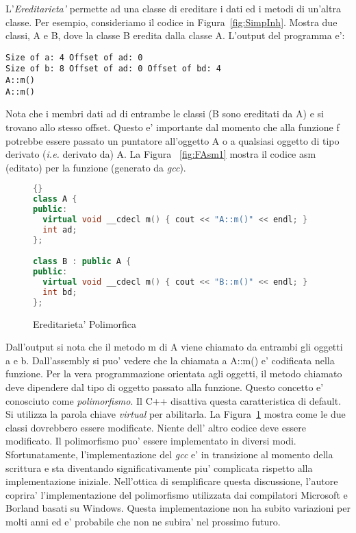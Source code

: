 L'\emph{Ereditarieta'} permette ad una classe di ereditare i dati ed i metodi
di un'altra classe. Per esempio, consideriamo il codice in Figura~\ref{fig:SimpInh}.
Mostra due classi, {\code A} e {\code B}, dove la classe {\code B} eredita dalla
classe {\code A}. 
L'output del programma e': 
\begin{verbatim}
Size of a: 4 Offset of ad: 0
Size of b: 8 Offset of ad: 0 Offset of bd: 4
A::m()
A::m()
\end{verbatim}
Nota che i membri dati {\code ad} di entrambe le classi ({\code B}
sono ereditati da {\code A}) e si trovano allo stesso offset. Questo e' importante
dal momento che alla funzione {\code f} potrebbe essere passato un
puntatore all'oggetto {\code A} o a qualsiasi oggetto di tipo derivato 
(\emph{i.e.} derivato da) {\code A}. La Figura ~\ref{fig:FAsm1} mostra
il codice asm (editato) per la funzione (generato da \emph{gcc}).

\begin{figure}[tp]
\begin{lstlisting}[language=C++, frame=tlrb]{}
class A {
public:
  virtual void __cdecl m() { cout << "A::m()" << endl; }
  int ad;
};

class B : public A {
public:
  virtual void __cdecl m() { cout << "B::m()" << endl; }
  int bd;
};
\end{lstlisting}
\caption{ Ereditarieta' Polimorfica \label{fig:VirtInh}}
\end{figure}

Dall'output si nota che il metodo {\code m} di {\code A} viene chiamato
da entrambi gli oggetti {\code a} e {\code b}. Dall'assembly si puo' 
vedere che la chiamata a {\code A::m()} e' codificata nella funzione.
Per la vera programmazione orientata agli oggetti, il metodo chiamato
deve dipendere dal tipo di oggetto passato alla funzione. Questo
concetto e' conosciuto come \emph{polimorfismo}. Il C++ disattiva
questa caratteristica di default. Si utilizza la parola chiave
\emph{virtual}  per abilitarla. La Figura~\ref{fig:VirtInh}
mostra come le due classi dovrebbero essere modificate. Niente dell'
altro codice deve essere modificato. Il polimorfismo puo' essere
implementato in diversi modi. Sfortunatamente, l'implementazione del
\emph{gcc} e' in transizione al momento della scrittura e sta diventando 
significativamente piu' complicata rispetto alla implementazione
iniziale. Nell'ottica di semplificare questa discussione, l'autore
coprira' l'implementazione del polimorfismo utilizzata dai compilatori
Microsoft e Borland basati su Windows. Questa implementazione non ha
subito variazioni per molti anni ed e' probabile che non ne subira'
nel prossimo futuro.

